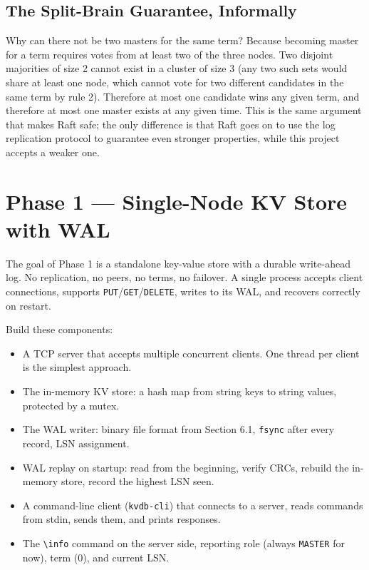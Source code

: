 \documentclass[11pt,a4paper]{article}
\begin{document}
\subsection{The Split-Brain Guarantee, Informally}
Why can there not be two masters for the same term? Because becoming master for a term requires votes from at least two of the three nodes. Two disjoint majorities of size 2 cannot exist in a cluster of size 3 (any two such sets would share at least one node, which cannot vote for two different candidates in the same term by rule 2). Therefore at most one candidate wins any given term, and therefore at most one master exists at any given time. This is the same argument that makes Raft safe; the only difference is that Raft goes on to use the log replication protocol to guarantee even stronger properties, while this project accepts a weaker one.

\section{Phase 1 --- Single-Node KV Store with WAL}

The goal of Phase 1 is a standalone key-value store with a durable write-ahead log. No replication, no peers, no terms, no failover. A single process accepts client connections, supports \texttt{PUT}/\texttt{GET}/\texttt{DELETE}, writes to its WAL, and recovers correctly on restart.

Build these components:

\begin{itemize}
\item A TCP server that accepts multiple concurrent clients. One thread per client is the simplest approach.

\item The in-memory KV store: a hash map from string keys to string values, protected by a mutex.

\item The WAL writer: binary file format from Section 6.1, \texttt{fsync} after every record, LSN assignment.

\item WAL replay on startup: read from the beginning, verify CRCs, rebuild the in-memory store, record the highest LSN seen.

\item A command-line client (\texttt{kvdb-cli}) that connects to a server, reads commands from stdin, sends them, and prints responses.

\item The \verb|\info| command on the server side, reporting role (always \texttt{MASTER} for now), term (0), and current LSN.
\end{itemize}
\end{document}
